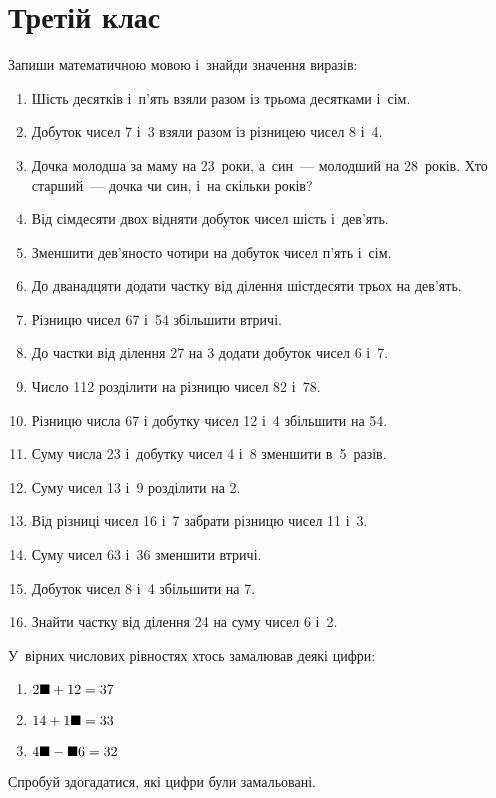 \chapter{Третій клас}

\problem
Запиши математичною мовою і~знайди значення виразів:
\begin{enumerate}
  \item Шість десятків і~п'ять взяли разом із трьома десятками і~сім.
  \item Добуток чисел 7 і~3 взяли разом із різницею чисел 8 і~4.
  \item Дочка молодша за маму на 23~роки, а~син~--- молодший на 28~років.
  Хто старший~--- дочка чи син, і~на скільки років?
  \item Від сімдесяти двох відняти добуток чисел шість і~дев'ять.
  \item Зменшити дев'яносто чотири на добуток чисел п'ять і~сім.
  \item До дванадцяти додати частку від ділення шістдесяти трьох на дев'ять.
  \item Різницю чисел 67 і~54 збільшити втричі.
  \item До частки від ділення 27 на 3 додати добуток чисел 6 і~7.
  \item Число 112 розділити на різницю чисел 82 і~78.
  \item Різницю числа 67 і добутку чисел 12 і~4 збільшити на 54.
  \item Суму числа 23 і~добутку чисел 4 і~8 зменшити в~5~разів.
  \item Суму чисел 13 і~9 розділити на 2.
  \item Від різниці чисел 16 і~7 забрати різницю чисел 11 і~3.
  \item Суму чисел 63 і~36 зменшити втричі.
  \item Добуток чисел 8 і~4 збільшити на 7.
  \item Знайти частку від ділення 24 на суму чисел 6 і~2.
\end{enumerate}


\problem
У~вірних числових рівностях хтось замалював деякі цифри:
\begin{multicols}{2}
  \begin{enumerate}
    \item $2\blacksquare + 12 = 37$
    \item $14 + 1\blacksquare = 33$
    \item $4\blacksquare - \blacksquare6 = 32$
  \end{enumerate}
\end{multicols}
Спробуй здогадатися, які цифри були замальовані.



